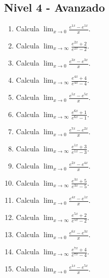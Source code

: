 \documentclass[11pt,a4paper]{article}
\begin{document}
\subsection{Nivel 4 - Avanzado}

\begin{enumerate}[label=\textbf{E\arabic*.},start=361]

\item Calcula $\displaystyle\lim_{x\to0}\frac{e^{1x}-e^{1x}}{x}$.

\item Calcula $\displaystyle\lim_{x\to\infty}\frac{e^{2x}+2}{e^{2x}-2}$.

\item Calcula $\displaystyle\lim_{x\to0}\frac{e^{3x}-e^{3x}}{x}$.

\item Calcula $\displaystyle\lim_{x\to\infty}\frac{e^{4x}+4}{e^{4x}-4}$.

\item Calcula $\displaystyle\lim_{x\to0}\frac{e^{5x}-e^{5x}}{x}$.

\item Calcula $\displaystyle\lim_{x\to\infty}\frac{e^{6x}+1}{e^{6x}-1}$.

\item Calcula $\displaystyle\lim_{x\to0}\frac{e^{7x}-e^{2x}}{x}$.

\item Calcula $\displaystyle\lim_{x\to\infty}\frac{e^{1x}+3}{e^{1x}-3}$.

\item Calcula $\displaystyle\lim_{x\to0}\frac{e^{2x}-e^{4x}}{x}$.

\item Calcula $\displaystyle\lim_{x\to\infty}\frac{e^{3x}+5}{e^{3x}-5}$.

\item Calcula $\displaystyle\lim_{x\to0}\frac{e^{4x}-e^{1x}}{x}$.

\item Calcula $\displaystyle\lim_{x\to\infty}\frac{e^{5x}+2}{e^{5x}-2}$.

\item Calcula $\displaystyle\lim_{x\to0}\frac{e^{6x}-e^{3x}}{x}$.

\item Calcula $\displaystyle\lim_{x\to\infty}\frac{e^{7x}+4}{e^{7x}-4}$.

\item Calcula $\displaystyle\lim_{x\to0}\frac{e^{1x}-e^{5x}}{x}$.


\end{enumerate}
\end{document}
